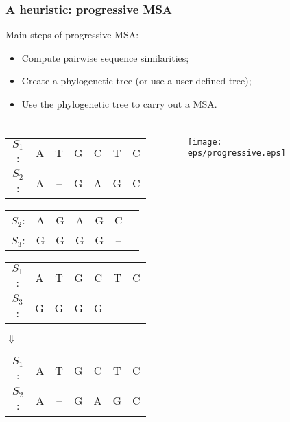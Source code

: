 \documentclass[xcolor=dvipsnames,envcountsect,handout]{beamer}
\begin{document}
\begin{frame}
\frametitle{A heuristic: progressive MSA}
{\hspace{12pt}} Main steps of progressive MSA:
\begin{itemize}
\item Compute pairwise sequence similarities;
\item Create a phylogenetic tree (or use a user-defined tree);
\item Use the phylogenetic tree to carry out a MSA.
\end{itemize}
\end{frame}


\begin{frame}
\frametitle{}
\begin{columns}
\begin{column}[t]{6cm}
\vspace{-8pt}
\begin{table}[H]
\begin{exampleblock}{}
\begin{tabular}{c c c c c c c}
$S_1$: & A & T  & G & C & T & C  \\
$S_2$: & A & -- & G & A & G & C  \\
\end{tabular}
\end{exampleblock}
\vspace{-10pt}
\begin{exampleblock}{}
\begin{tabular}{c c c c c c c}
$S_2$: & A & G & A & G & C   &    \\
$S_3$: & G & G & G & G & --  &    \\
\end{tabular}
\end{exampleblock}
\vspace{-10pt}
\begin{exampleblock}{}
\begin{tabular}{c c c c c c c}
$S_1$: & A & T & G & C & T   & C  \\
$S_3$: & G & G & G & G & --  & -- 
\end{tabular}
\end{exampleblock}
$\Downarrow$
\begin{alertblock}{}
\begin{tabular}{c c c c c c c}
$S_1$: & A & T  & G & C & T & C  \\
$S_2$: & A & -- & G & A & G & C  
\end{tabular}
\end{alertblock}
\end{table}
\end{column}
\begin{column}[t]{5cm}
\vspace{20pt}
\begin{figure}[H]
\centering
\hspace{-12pt}
\texttt{[image: eps/progressive.eps]}
\end{figure}
\end{column}
\end{columns}
\end{frame}
\end{document}

